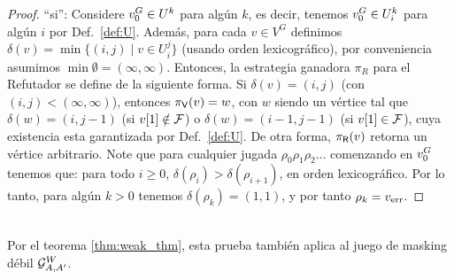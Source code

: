 \begin{proof}
``si'': Considere $\InitVertex^G \in U^k$ para algún $k$, es decir, tenemos  $\InitVertex^G \in U^k_i$ para algún $i$ por Def.~\ref{def:U}. 
Además, para cada $v \in V^G$ definimos $\delta(v) = \min \{ (i,j) \mid v \in U^j_i \}$ (usando orden lexicográfico), por conveniencia asumimos $\min \emptyset = (\infty, \infty)$.
Entonces, la estrategia ganadora $\pi_R$ para el Refutador se define de la siguiente forma. Si $\delta(v) = (i,j)$ (con $(i,j) < (\infty, \infty)$), entonces $\pi_\Verifier(v) = w$, con $w$ siendo un vértice tal que
$\delta(w) = (i,j-1)$ (si $\pr{1}{v} \notin \Faults$) o $\delta(w) = (i-1,j-1)$ (si $\pr{1}{v} \in \Faults$), cuya existencia esta garantizada por Def.~\ref{def:U}. De otra forma, $\pi_\Refuter(v)$ retorna
un vértice arbitrario. Note que para cualquier jugada $\rho_0 \rho_1 \rho_2 \dots$ comenzando en $\InitVertex^G$ tenemos que:  para todo $i \geq 0$, $\delta(\rho_i) > \delta(\rho_{i+1})$, en orden lexicográfico.
Por lo tanto, para algún $k>0$ tenemos $\delta(\rho_k) = (1,1)$, y por tanto $\rho_k = \ErrorSt$.
\qedhere
\end{proof} \\

Por el teorema \ref{thm:weak_thm}, esta prueba también aplica al juego de masking débil $\WeakMaskGG$.
